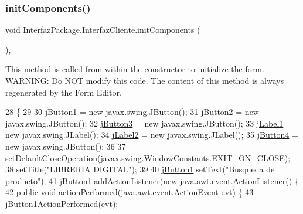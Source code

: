 \subsubsection{\texorpdfstring{init\+Components()}{initComponents()}}
{\footnotesize\ttfamily void Interfaz\+Package.\+Interfaz\+Cliente.\+init\+Components (\begin{DoxyParamCaption}{ }\end{DoxyParamCaption})\hspace{0.3cm}{\ttfamily [inline]}, {\ttfamily [private]}}

This method is called from within the constructor to initialize the form. W\+A\+R\+N\+I\+NG\+: Do N\+OT modify this code. The content of this method is always regenerated by the Form Editor. 
\begin{DoxyCode}
28                                   \{
29 
30         \mbox{\hyperlink{class_interfaz_package_1_1_interfaz_cliente_a3734b48adc59c34c0adb8eb82178f408}{jButton1}} = \textcolor{keyword}{new} javax.swing.JButton();
31         \mbox{\hyperlink{class_interfaz_package_1_1_interfaz_cliente_a0196e2e1cfcbbbc8861c08f6a0a37ae4}{jButton2}} = \textcolor{keyword}{new} javax.swing.JButton();
32         \mbox{\hyperlink{class_interfaz_package_1_1_interfaz_cliente_a25b735a55e8862dffce033dda1112430}{jButton3}} = \textcolor{keyword}{new} javax.swing.JButton();
33         \mbox{\hyperlink{class_interfaz_package_1_1_interfaz_cliente_a566a82ef3d269cafc1ea835fddd6a92a}{jLabel1}} = \textcolor{keyword}{new} javax.swing.JLabel();
34         \mbox{\hyperlink{class_interfaz_package_1_1_interfaz_cliente_adddf6bbdd3ebab836af4f159294fd8ff}{jLabel2}} = \textcolor{keyword}{new} javax.swing.JLabel();
35         \mbox{\hyperlink{class_interfaz_package_1_1_interfaz_cliente_a724801e1312c508ba148b8928739811e}{jButton4}} = \textcolor{keyword}{new} javax.swing.JButton();
36 
37         setDefaultCloseOperation(javax.swing.WindowConstants.EXIT\_ON\_CLOSE);
38         setTitle(\textcolor{stringliteral}{"LIBRERIA DIGITAL"});
39 
40         \mbox{\hyperlink{class_interfaz_package_1_1_interfaz_cliente_a3734b48adc59c34c0adb8eb82178f408}{jButton1}}.setText(\textcolor{stringliteral}{"Busqueda de producto"});
41         \mbox{\hyperlink{class_interfaz_package_1_1_interfaz_cliente_a3734b48adc59c34c0adb8eb82178f408}{jButton1}}.addActionListener(\textcolor{keyword}{new} java.awt.event.ActionListener() \{
42             \textcolor{keyword}{public} \textcolor{keywordtype}{void} actionPerformed(java.awt.event.ActionEvent evt) \{
43                 \mbox{\hyperlink{class_interfaz_package_1_1_interfaz_cliente_a0734280a4dc2dfc6f1c2a629118d07dd}{jButton1ActionPerformed}}(evt);

\end{DoxyCode}
